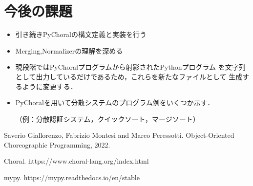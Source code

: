 \documentclass[11pt]{jarticle}
\begin{document}
\section{今後の課題}
\begin{itemize}
  \item 引き続きPyChoralの構文定義と実装を行う
  \item Merging,Normalizerの理解を深める
  \item 現段階ではPyChoralプログラムから射影されたPythonプログラム
  を文字列として出力しているだけであるため，これらを新たなファイルとして
  生成するように変更する．
  \item PyChoralを用いて分散システムのプログラム例をいくつか示す．
  
  （例：分散認証システム，クイックソート，マージソート）
\end{itemize}
\begin{thebibliography}{99}
  Saverio Giallorenzo, Fabrizio Montesi and Marco Peressotti. 
  Object-Oriented Choreographic Programming, 2022.

   Choral.    https://www.choral-lang.org/index.html
  
   mypy.   https://mypy.readthedocs.io/en/stable
\end{thebibliography}
%
\end{document}
